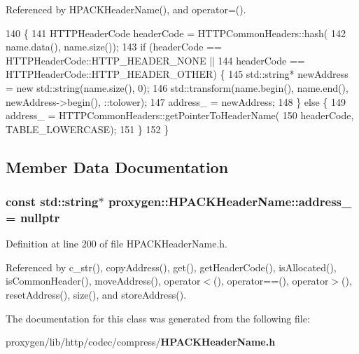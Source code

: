 Referenced by H\+P\+A\+C\+K\+Header\+Name(), and operator=().


\begin{DoxyCode}
140                                            \{
141     HTTPHeaderCode headerCode = HTTPCommonHeaders::hash(
142       name.data(), name.size());
143     \textcolor{keywordflow}{if} (headerCode == HTTPHeaderCode::HTTP_HEADER_NONE ||
144         headerCode == HTTPHeaderCode::HTTP_HEADER_OTHER) \{
145       std::string* newAddress = \textcolor{keyword}{new} std::string(name.size(), 0);
146       std::transform(name.begin(), name.end(), newAddress->begin(), ::tolower);
147       address_ = newAddress;
148     \} \textcolor{keywordflow}{else} \{
149       address_ = HTTPCommonHeaders::getPointerToHeaderName(
150         headerCode, TABLE_LOWERCASE);
151     \}
152   \}
\end{DoxyCode}


\subsection{Member Data Documentation}
\subsubsection[{address\+\_\+}]{\setlength{\rightskip}{0pt plus 5cm}const std\+::string$\ast$ proxygen\+::\+H\+P\+A\+C\+K\+Header\+Name\+::address\+\_\+ = {\bf nullptr}\hspace{0.3cm}{\ttfamily [private]}}\label{classproxygen_1_1HPACKHeaderName_a1d56c964a1ae28dfa23caddb0864aaf9}


Definition at line 200 of file H\+P\+A\+C\+K\+Header\+Name.\+h.



Referenced by c\+\_\+str(), copy\+Address(), get(), get\+Header\+Code(), is\+Allocated(), is\+Common\+Header(), move\+Address(), operator$<$(), operator==(), operator$>$(), reset\+Address(), size(), and store\+Address().



The documentation for this class was generated from the following file\+:\begin{DoxyCompactItemize}
\item 
proxygen/lib/http/codec/compress/{\bf H\+P\+A\+C\+K\+Header\+Name.\+h}\end{DoxyCompactItemize}
